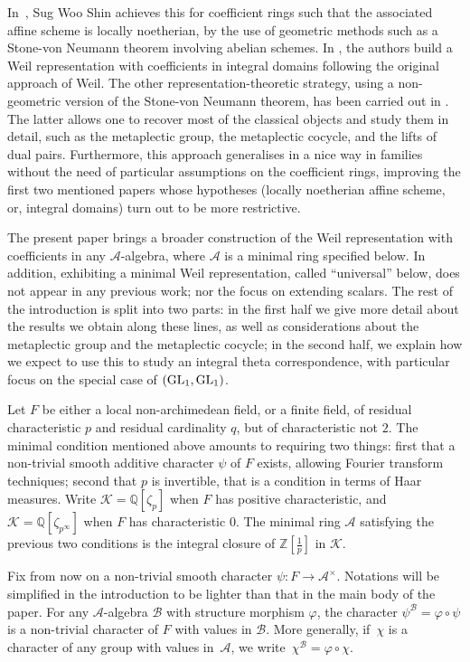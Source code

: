 \documentclass[11pt]{article}
\theoremstyle{plain}
\theoremstyle{definition}
\theoremstyle{plain}
\theoremstyle{definition}
\theoremstyle{plain}
\begin{document}
In~\cite{shin_weil}, Sug Woo Shin achieves this for coefficient rings such that the associated affine scheme is locally noetherian, by the use of geometric methods such as a Stone-von Neumann theorem involving abelian schemes. In \cite{ct}, the authors build a Weil representation with coefficients in integral domains following the original approach of Weil. The other representation-theoretic strategy, using a non-geometric version of the Stone-von Neumann theorem, has been carried out in \cite{trias_theta1}. The latter allows one to recover most of the classical objects and study them in detail, such as the metaplectic group, the metaplectic cocycle, and the lifts of dual pairs. Furthermore, this approach generalises in a nice way in families without the need of particular assumptions on the coefficient rings, improving the first two mentioned papers whose hypotheses (locally noetherian affine scheme, or, integral domains) turn out to be more restrictive. 

The present paper brings a broader construction of the Weil representation with coefficients in any $\mathcal{A}$-algebra, where $\mathcal{A}$ is a minimal ring specified below. In addition, exhibiting a minimal Weil representation, called ``universal'' below, does not appear in any previous work; nor the focus on extending scalars. The rest of the introduction is split into two parts: in the first half we give more detail about the results we obtain along these lines, as well as considerations about the metaplectic group and the metaplectic cocycle; in the second half, we explain how we expect to use this to study an integral theta correspondence, with particular focus on the special case of $(\textup{GL}_1,\textup{GL}_1)$.

Let $F$ be either a local non-archimedean field, or a finite field, of residual characteristic $p$ and residual cardinality $q$, but of characteristic not $2$. The minimal condition mentioned above amounts to requiring two things: first that a non-trivial smooth additive character $\psi$ of $F$ exists, allowing Fourier transform techniques; second that $p$ is invertible, that is a condition in terms of Haar measures. Write $\mathcal{K} = \mathbb{Q}[\zeta_p]$ when $F$ has positive characteristic, and $\mathcal{K}=\mathbb{Q}[\zeta_{p^\infty}]$ when $F$ has characteristic $0$. The minimal ring $\mathcal{A}$ satisfying the previous two conditions is the integral closure of $\mathbb{Z}[\frac{1}{p}]$ in $\mathcal{K}$.

Fix from now on a non-trivial smooth character $\psi : F \to \mathcal{A}^\times$. Notations will be simplified in the introduction to be lighter than that in the main body of the paper. For any $\mathcal{A}$-algebra $\mathcal{B}$ with structure morphism $\varphi$, the character $\psi^\mathcal{B} = \varphi \circ \psi$ is a non-trivial character of $F$ with values in $\mathcal{B}$. More generally, if~$\chi$ is a character of any group with values in~$\mathcal{A}$, we write~$\chi^{\mathcal{B}}=\varphi\circ\chi$.
\end{document}
